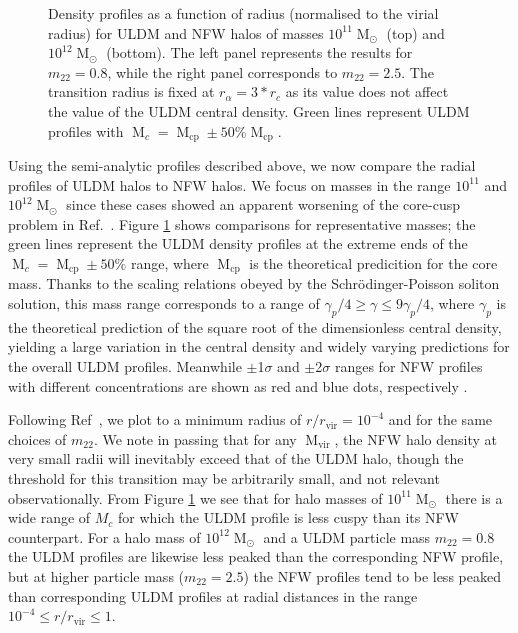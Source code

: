\documentclass[a4paper,11pt]{article}
\begin{document}
\begin{figure}
\begin{tabular}{cc}
\end{tabular}
\caption{Density profiles as a function of radius (normalised to the virial radius) for ULDM and NFW halos of masses $10^{11}\operatorname{M}_{\odot}$ (top) and $10^{12}\operatorname{M}_{\odot}$ (bottom). The left panel represents the results for $m_{22} = 0.8$, while the right panel corresponds to $m_{22}=2.5$. The transition radius is fixed at $r_{\alpha} = 3*r_c$ as its value does not affect the value of the ULDM central density. Green lines represent  ULDM profiles with $\operatorname{M}_c = \operatorname{M}_{\mathrm{cp}} \pm 50 \% \operatorname{M}_{\mathrm{cp}}$.}\label{fig:profiles}
\end{figure}

 
Using the semi-analytic profiles described above, we now compare the radial profiles of ULDM halos to NFW halos. We focus on masses in the range $10^{11}$ and $10^{12} \operatorname{M}_{\odot}$ since these cases showed an apparent worsening of the core-cusp problem in Ref.~\cite{Robles:2018fur}. Figure \ref{fig:profiles} shows comparisons for representative masses; the green lines represent the ULDM density profiles at the extreme ends of the $\operatorname{M}_c = \operatorname{M}_{\mathrm{cp}} \pm 50 \% $ range, where $\operatorname{M}_{\mathrm{cp}}$ is the theoretical predicition for the core mass. Thanks to the scaling relations obeyed by the Schr{\"o}dinger-Poisson soliton solution, this mass range corresponds to a range of $ \gamma_p /4 \geq \gamma \leq 9\gamma_p/4$, where $\gamma_p$ is the theoretical prediction of the square root of the dimensionless central density, yielding a large variation in the central density and widely varying predictions for the overall ULDM profiles. Meanwhile $\pm$1$\sigma$ and $\pm$2$\sigma$ ranges for NFW profiles with different concentrations are shown as red and blue dots, respectively \cite{Maccio:2008pcd}. 

Following Ref~\cite{Robles:2018fur}, we plot to a minimum radius of $r/r_{\mathrm{vir}} = 10^{-4}$ and for the same choices of $m_{22}$. We note in passing that for any $\operatorname{M}_{\mathrm{vir}}$, the NFW halo density at very small radii will inevitably exceed that of the ULDM halo, though the threshold for this transition may be arbitrarily small, and not relevant observationally.  From Figure \ref{fig:profiles} we see that for halo masses of $10^{11}\operatorname{M}_{\odot}$ there is a wide range of $M_c$ for which the ULDM profile is less cuspy than its NFW counterpart.  For a halo mass of $10^{12}\operatorname{M}_{\odot}$ and a ULDM particle mass $m_{22}=0.8$ the ULDM profiles are likewise less peaked than the corresponding NFW profile, but at higher particle mass ($m_{22}=2.5$) the  NFW profiles tend to be less peaked than corresponding ULDM profiles at radial distances in  the range $10^{-4}\leq r/r_{\mathrm{vir}} \leq 1$.
\end{document}

